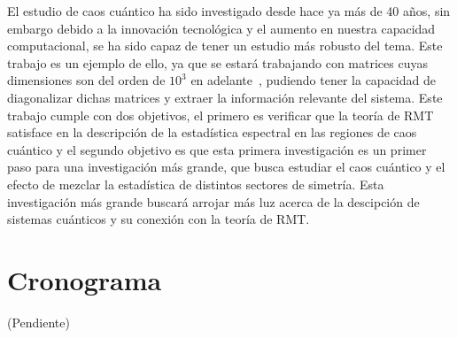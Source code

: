 \documentclass[spanish,titlepage,table]{practicas}
\begin{document}
El estudio de caos cuántico ha sido investigado desde hace ya más de 40 años, sin embargo debido a la innovación tecnológica y el aumento en nuestra capacidad 
computacional, se ha sido capaz de tener un estudio más robusto del tema. Este trabajo es un ejemplo de ello, ya que 
se estará trabajando con matrices cuyas dimensiones son del orden de $10^{3}$ en adelante~\cite{Zhang2010}, 
pudiendo tener la capacidad de diagonalizar dichas matrices y extraer la información relevante del sistema.
Este trabajo cumple con dos objetivos, el primero es verificar que la teoría de RMT satisface en la descripción de la 
estadística espectral en las regiones de caos cuántico y el segundo objetivo es que esta primera investigación es 
un primer paso para una investigación más grande, que busca estudiar el caos cuántico y el efecto de mezclar la estadística 
de distintos sectores de simetría. Esta investigación más grande buscará arrojar más luz acerca de la descipción de sistemas cuánticos y su conexión con la teoría de RMT.


\section{Cronograma}
(Pendiente)


\end{document}
